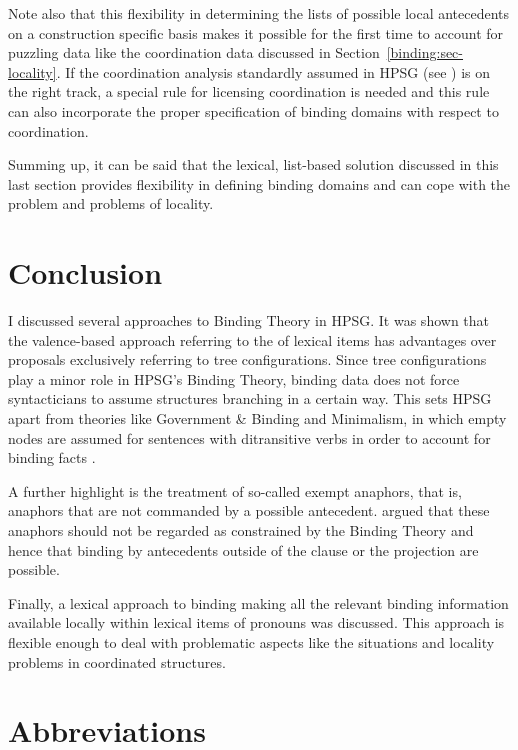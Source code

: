 \documentclass[output=paper,biblatex,babelshorthands,newtxmath,draftmode,colorlinks,citecolor=brown]{langscibook}
\begin{document}
Note also that this flexibility in determining the lists of possible local antecedents on a
construction specific basis makes it possible for the first time to account for puzzling data like
the coordination data discussed in Section~\ref{binding:sec-locality}. If the coordination analysis
standardly assumed in HPSG (see ) is on the right track, a special
rule for licensing coordination is needed and this rule can also incorporate the proper
specification of binding domains with respect to coordination.


Summing up, it can be said that the lexical, list-based solution discussed in this last section
provides flexibility in defining binding domains and can cope with the \iwithini problem and
problems of locality. 


\section{Conclusion}

I discussed several approaches to Binding Theory in HPSG. It was shown that the
valence-based approach referring to the \argstl of lexical items has advantages over proposals
exclusively referring to tree configurations. Since tree configurations play a minor role in HPSG's
Binding Theory, binding data does not force syntacticians to assume structures branching in a
certain way. This sets HPSG apart from theories like Government \& Binding and Minimalism, in which
empty nodes are assumed for sentences with ditransitive verbs in order to account for binding facts
\crossrefchapterp[\pageref{minimalism:page-binding-branching-start}--\pageref{minimalism:page-binding-branching-end}]{minimalism}. 

A further highlight is the treatment of so-called exempt anaphors, that is, anaphors that are not
commanded by a possible antecedent. \citet{PS92a}
argued that these anaphors should not be regarded
as constrained by the Binding Theory and hence that binding by antecedents outside of the clause or
the projection are possible.

Finally, a lexical approach to binding making all the relevant binding information
available locally within lexical items of pronouns was discussed. This approach is flexible enough to deal with
problematic aspects like the \iwithini situations and locality problems in coordinated structures.

\section*{Abbreviations}
\end{document}
